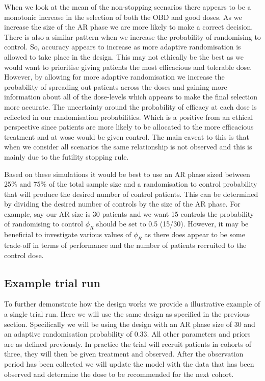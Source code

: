When we look at the mean of the non-stopping scenarios there appears to be a monotonic increase in the selection of both the OBD and good doses. As we increase the size of the AR phase we are more likely to make a correct decision. There is also a similar pattern when we increase the probability of randomising to control. So, accuracy appears to increase as more adaptive randomisation is allowed to take place in the design. This may not ethically be the best as we would want to prioritise giving patients the most efficacious and tolerable dose. However, by allowing for more adaptive randomisation we increase the probability of spreading out patients across the doses and gaining more information about all of the dose-levels which appears to make the final selection more accurate. The uncertainty around the probability of efficacy at each dose is reflected in our randomisation probabilities. Which is a positive from  an ethical perspective since patients are more likely to be allocated to the more efficacious treatment and at wose would be given control. The main caveat to this is that when we consider all scenarios the same relationship is not observed and this is mainly due to the futility stopping rule. 

Based on these simulations it would be best to use an AR phase sized between 25\% and 75\% of the total sample size and a randomisation to control probability that will produce the desired number of control patients. This can be determined by dividing the desired number of controls by the size of the AR phase. For example, say our AR size is 30 patients and we want 15 controls the probability of randomising to control $\phi_R$ should be set to 0.5 (15/30). However, it may be beneficial to investigate various values of $\phi_R$ as there does appear to be some trade-off in terms of performance and the number of patients recruited to the control dose.

\subsection{Example trial run}
\label{WT:toy}

To further demonstrate how the design works we provide a illustrative example of a single trial run. Here we will use the same design as specified in the previous section. Specifically we will be using the design with an AR phase size of 30 and an adaptive randomisation probability of 0.33. All other parameters and priors are as defined previously. In practice the trial will recruit patients in cohorts of three, they will then be given treatment and observed. After the observation period has been collected we will update the model with the data that has been observed and determine the dose to be recommended for the next cohort. 

